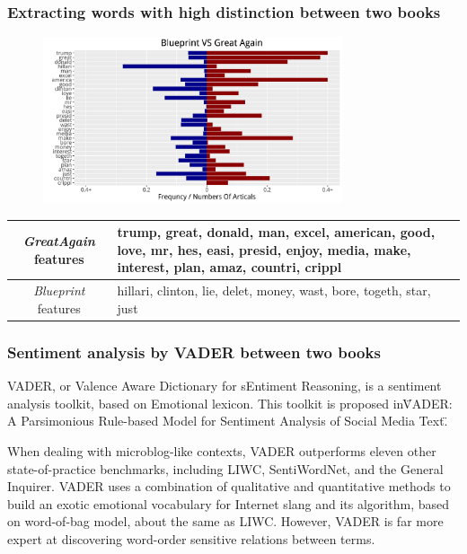 \documentclass[9pt]{beamer}
\begin{document}
\begin{frame}
\frametitle{Extracting words with high distinction between two books}
\begin{figure}[H]
	\centering
	\includegraphics[width=250pt]{bagofwords_bar.pdf}
\end{figure}
\begin{table}[H]
	\centering
	\begin{tabular}{cp{200pt}}
		\hline
		 \textit{GreatAgain} features & trump, great, donald, man, excel, american, good, love, mr,  hes, easi, presid, enjoy, media, make, interest, plan, amaz, countri, crippl \\
		 \hline
		 \textit{Blueprint} features & hillari, clinton, lie, delet, money, wast, bore, togeth, star, just \\
		\hline
	\end{tabular}
\end{table}
\end{frame}

\begin{frame}
\frametitle{Sentiment analysis by VADER between two books}
VADER, or Valence Aware Dictionary for sEntiment Reasoning, is a sentiment analysis toolkit, based on Emotional lexicon. This toolkit is proposed in\"VADER: A Parsimonious Rule-based Model for Sentiment Analysis of Social Media Text\".

When dealing with microblog-like contexts, VADER outperforms eleven other state-of-practice benchmarks, including LIWC, SentiWordNet, and the General Inquirer. VADER uses a combination of qualitative and quantitative methods to build an exotic emotional vocabulary for Internet slang and its algorithm, based on word-of-bag model, about the same as LIWC. However, VADER is far more expert at discovering word-order sensitive relations between terms.
\end{frame}
\end{document}
